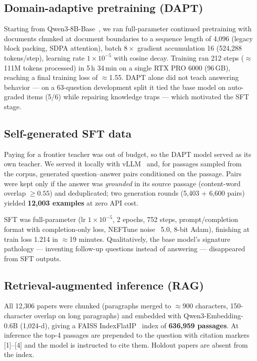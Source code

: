 \documentclass[11pt]{article}
\begin{document}
\subsection{Domain-adaptive pretraining (DAPT)}

Starting from Qwen3-8B-Base~\cite{qwen3}, we ran full-parameter continued
pretraining with documents chunked at document boundaries to a sequence
length of 4,096 (legacy block packing, SDPA attention), batch
$8 \times$ gradient accumulation 16 (524,288 tokens/step), learning rate
$1\times10^{-5}$ with cosine decay. Training ran 212 steps ($\approx$111M
tokens processed) in 5\,h 34\,min on a single RTX PRO 6000 (96\,GB),
reaching a final training loss of $\approx$1.55. DAPT alone did not teach
answering behavior --- on a 63-question development split it tied the base
model on auto-graded items (5/6) while repairing knowledge traps --- which
motivated the SFT stage.

\subsection{Self-generated SFT data}

Paying for a frontier teacher was out of budget, so the DAPT model served
as its own teacher. We served it locally with vLLM~\cite{vllm} and, for
passages sampled from the corpus, generated question--answer pairs
conditioned on the passage. Pairs were kept only if the answer was
\emph{grounded} in its source passage (content-word overlap $\geq 0.55$)
and deduplicated; two generation rounds (5,403 + 6,600 pairs) yielded
\textbf{12,003 examples} at zero API cost.

SFT was full-parameter (lr $1\times10^{-5}$, 2 epochs, 752 steps,
prompt/completion format with completion-only loss, NEFTune
noise~\cite{neftune} 5.0, 8-bit Adam), finishing at train loss 1.214 in
$\approx$19 minutes. Qualitatively, the base model's signature pathology
--- inventing follow-up questions instead of answering --- disappeared
from SFT outputs.

\subsection{Retrieval-augmented inference (RAG)}

All 12,306 papers were chunked (paragraphs merged to $\approx$900
characters, 150-character overlap on long paragraphs) and embedded with
Qwen3-Embedding-0.6B (1,024-d), giving a FAISS IndexFlatIP~\cite{faiss}
index of \textbf{636,959 passages}. At inference the top-4 passages are
prepended to the question with citation markers [1]--[4] and the model is
instructed to cite them. Holdout papers are absent from the index.
\end{document}
